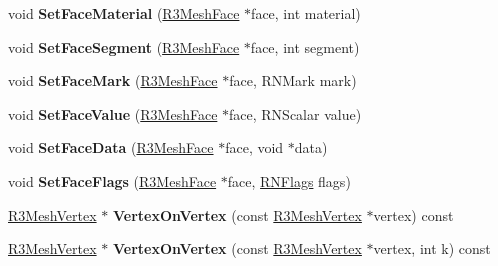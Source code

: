 \begin{DoxyCompactItemize}
\item 
void {\bfseries Set\+Face\+Material} (\hyperlink{class_r3_mesh_face}{R3\+Mesh\+Face} $\ast$face, int material)\hypertarget{class_r3_mesh_a36d5b143985d36072ee7ba904b99b05e}{}\label{class_r3_mesh_a36d5b143985d36072ee7ba904b99b05e}

\item 
void {\bfseries Set\+Face\+Segment} (\hyperlink{class_r3_mesh_face}{R3\+Mesh\+Face} $\ast$face, int segment)\hypertarget{class_r3_mesh_a205c6baae4f9497c0ae7b32c9d97c742}{}\label{class_r3_mesh_a205c6baae4f9497c0ae7b32c9d97c742}

\item 
void {\bfseries Set\+Face\+Mark} (\hyperlink{class_r3_mesh_face}{R3\+Mesh\+Face} $\ast$face, R\+N\+Mark mark)\hypertarget{class_r3_mesh_ad56a689642ff5e36b1a272db787b6be6}{}\label{class_r3_mesh_ad56a689642ff5e36b1a272db787b6be6}

\item 
void {\bfseries Set\+Face\+Value} (\hyperlink{class_r3_mesh_face}{R3\+Mesh\+Face} $\ast$face, R\+N\+Scalar value)\hypertarget{class_r3_mesh_a5bf16e6774ec6ae452eccc5172a6f140}{}\label{class_r3_mesh_a5bf16e6774ec6ae452eccc5172a6f140}

\item 
void {\bfseries Set\+Face\+Data} (\hyperlink{class_r3_mesh_face}{R3\+Mesh\+Face} $\ast$face, void $\ast$data)\hypertarget{class_r3_mesh_a1ddd1fdc297456764d66c23d6aa2b882}{}\label{class_r3_mesh_a1ddd1fdc297456764d66c23d6aa2b882}

\item 
void {\bfseries Set\+Face\+Flags} (\hyperlink{class_r3_mesh_face}{R3\+Mesh\+Face} $\ast$face, \hyperlink{class_r_n_flags}{R\+N\+Flags} flags)\hypertarget{class_r3_mesh_a41e38d95b39d9802864483f5d285755e}{}\label{class_r3_mesh_a41e38d95b39d9802864483f5d285755e}

\item 
\hyperlink{class_r3_mesh_vertex}{R3\+Mesh\+Vertex} $\ast$ {\bfseries Vertex\+On\+Vertex} (const \hyperlink{class_r3_mesh_vertex}{R3\+Mesh\+Vertex} $\ast$vertex) const \hypertarget{class_r3_mesh_a2d23eab3e3a11a3ceefdf9d9b784c785}{}\label{class_r3_mesh_a2d23eab3e3a11a3ceefdf9d9b784c785}

\item 
\hyperlink{class_r3_mesh_vertex}{R3\+Mesh\+Vertex} $\ast$ {\bfseries Vertex\+On\+Vertex} (const \hyperlink{class_r3_mesh_vertex}{R3\+Mesh\+Vertex} $\ast$vertex, int k) const \hypertarget{class_r3_mesh_aab218a3e27a545d1c2d9cf95f3412589}{}\label{class_r3_mesh_aab218a3e27a545d1c2d9cf95f3412589}


\end{DoxyCompactItemize}
